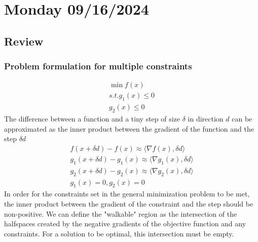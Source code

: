 \section{Monday 09/16/2024}
\subsection{Review}
\subsubsection{Problem formulation for multiple constraints}

\begin{equation}
  \begin{aligned}
    \min f(x) \\
    s.t. g_1(x) \leq 0 \\
    g_2(x) \leq 0
  \end{aligned}
\end{equation}
The difference between a function and a tiny step of size $\delta$ in direction $d$ can be approximated as the inner product between the gradient of the function and the step $\delta d$
\begin{equation}
  \begin{aligned}
    f(x + \delta d) - f(x) \approx \langle \nabla f(x),  \delta d \rangle \\
    g_1(x + \delta d) - g_1(x) \approx \langle \nabla g_1(x),  \delta d \rangle \\
    g_2(x + \delta d) - g_2(x) \approx \langle \nabla g_2(x),  \delta d \rangle \\
    g_1(x) = 0, g_2(x) = 0
  \end{aligned}
\end{equation}
In order for the constraints set in the general minimization problem to be met, the inner product between the gradient of the constraint and the step should be non-positive. We can define the "walkable" region as the intersection of the halfspaces created by the negative gradients of the objective function and any constraints. For a solution to be optimal, this intersection must be empty.
